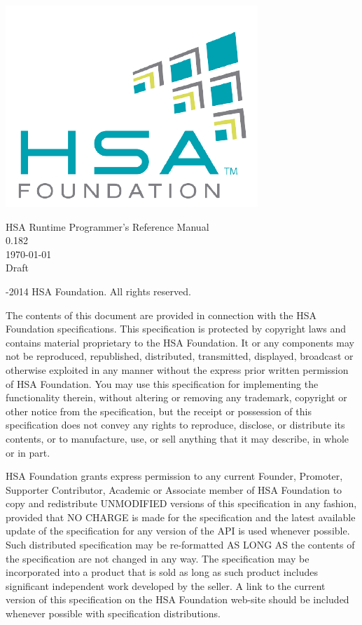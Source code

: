 \documentclass[final]{book}
\newcommand{\doctitle}{HSA Runtime Programmer's Reference Manual}
\newcommand{\docversion}{0.182}
\begin{document}
\hypersetup{pageanchor=false,citecolor=black}
\begin{titlepage}
\includegraphics[width=.5\textwidth]{fig/foundation.png}
\vspace*{7cm}
\begin{center}
{\Large \doctitle\\[1ex]\large\docversion}\\
\vspace*{1cm}
\vspace*{0.5cm}
{\small \today}\\
\vspace*{0.5cm}
{\small Draft}\\
\end{center}
\end{titlepage}
\thispagestyle{empty} {-2014 HSA Foundation. All rights
  reserved.}


The contents of this document are provided in connection with the HSA Foundation
specifications. This specification is protected by copyright laws and contains
material proprietary to the HSA Foundation. It or any components may not be
reproduced, republished, distributed, transmitted, displayed, broadcast or
otherwise exploited in any manner without the express prior written permission
of HSA Foundation. You may use this specification for implementing the
functionality therein, without altering or removing any trademark, copyright or
other notice from the specification, but the receipt or possession of this
specification does not convey any rights to reproduce, disclose, or distribute
its contents, or to manufacture, use, or sell anything that it may describe, in
whole or in part.

HSA Foundation grants express permission to any current Founder, Promoter,
Supporter Contributor, Academic or Associate member of HSA Foundation to copy
and redistribute UNMODIFIED versions of this specification in any fashion,
provided that NO CHARGE is made for the specification and the latest available
update of the specification for any version of the API is used whenever
possible. Such distributed specification may be re-formatted AS LONG AS the
contents of the specification are not changed in any way. The specification may
be incorporated into a product that is sold as long as such product includes
significant independent work developed by the seller. A link to the current
version of this specification on the HSA Foundation web-site should be included
whenever possible with specification distributions.
\end{document}

